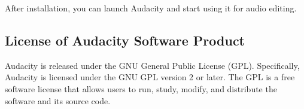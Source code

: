 After installation, you can launch Audacity and start using it for audio editing.

\subsection{License of Audacity Software Product}

Audacity is released under the GNU General Public License (GPL). Specifically, Audacity is licensed under the GNU GPL version 2 or later. The GPL is a free software license that allows users to run, study, modify, and distribute the software and its source code.

